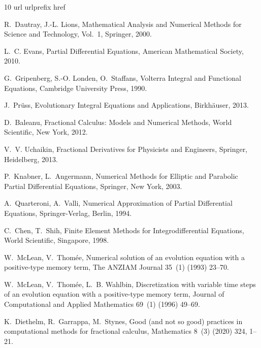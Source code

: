 \documentclass[3p]{elsarticle}
\numberwithin{equation}{section}
\begin{document}
%      
% 

\begin{thebibliography}{10}
\expandafter\ifx\csname url\endcsname\relax
  \def\url#1{\texttt{#1}}\fi
\expandafter\ifx\csname urlprefix\endcsname\relax\def\urlprefix{URL }\fi
\expandafter\ifx\csname href\endcsname\relax
  \def\href#1#2{#2} \def\path#1{#1}\fi

R.~Dautray, J.-L. Lions, Mathematical Analysis and Numerical Methods for
  Science and Technology, Vol.~1, Springer, 2000.

L.~C. Evans, Partial Differential Equations, American Mathematical Society,
  2010.

G.~Gripenberg, S.-O. Londen, O.~Staffans, Volterra Integral and Functional
  Equations, Cambridge University Press, 1990.

J.~Pr{\"u}ss, Evolutionary Integral Equations and Applications, Birkh{\"a}user,
  2013.

D.~Baleanu, Fractional Calculus: Models and Numerical Methods, World
  Scientific, New York, 2012.

V.~V. Uchaikin, Fractional Derivatives for Physicists and Engineers, Springer,
  Heidelberg, 2013.

P.~Knabner, L.~Angermann, Numerical Methods for Elliptic and Parabolic Partial
  Differential Equations, Springer, New York, 2003.

A.~Quarteroni, A.~Valli, Numerical Approximation of Partial Differential
  Equations, Springer-Verlag, Berlin, 1994.

C.~Chen, T.~Shih, Finite Element Methods for Integrodifferential Equations,
  World Scientific, Singapore, 1998.

W.~McLean, V.~Thom{\'e}e, Numerical solution of an evolution equation with a
  positive-type memory term, The ANZIAM Journal 35~(1) (1993) 23--70.

W.~McLean, V.~Thom{\'e}e, L.~B. Wahlbin, Discretization with variable time
  steps of an evolution equation with a positive-type memory term, Journal of
  Computational and Applied Mathematics 69~(1) (1996) 49--69.

K.~Diethelm, R.~Garrappa, M.~Stynes, Good (and not so good) practices in
  computational methods for fractional calculus, Mathematics 8~(3) (2020) 324,
  1--21.


\end{thebibliography}
\end{document}
